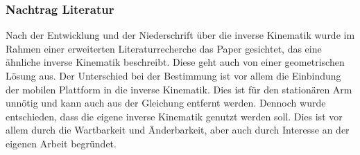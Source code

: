 \subsubsection{Nachtrag Literatur}
Nach der Entwicklung und der Niederschrift über die inverse Kinematik wurde im Rahmen einer erweiterten Literaturrecherche das Paper \cite{6309496} gesichtet, das eine ähnliche inverse Kinematik beschreibt. Diese geht auch von einer geometrischen Lösung aus. Der Unterschied bei der Bestimmung ist vor allem die Einbindung der mobilen Plattform in die inverse Kinematik. Dies ist für den stationären Arm unnötig und kann auch aus der Gleichung entfernt werden. Dennoch wurde entschieden, dass die eigene inverse Kinematik genutzt werden soll. Dies ist vor allem durch die Wartbarkeit und Änderbarkeit, aber auch durch Interesse an der eigenen Arbeit begründet.
